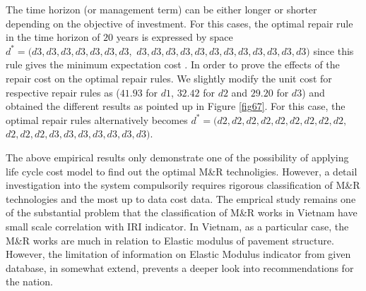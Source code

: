 The time horizon (or management term) can be either longer or shorter depending on the objective of investment. For this cases, the optimal repair rule in the time horizon of $20$ years is expressed by space $d^*=(d3, d3, d3, d3, d3, d3, d3,$ $d3, d3, d3, d3, d3, d3, d3, d3, d3, d3, d3, d3)$ since this rule gives the minimum expectation cost . In order to prove the effects of the repair cost on the optimal repair rules. We slightly modify the unit cost for respective repair rules as ($41.93$ for $d1$, $32.42$ for $d2$ and $29.20$ for $d3$) and obtained the different results as pointed up in Figure \ref{fig67}. For this case, the optimal repair rules alternatively becomes $d^*=(d2, d2, d2, d2, d2, d2, d2, d2, d2,$ $ d2, d2, d2, d3, d3, d3, d3, d3, d3, d3)$.

The above empirical results only demonstrate one of the possibility of applying life cycle cost model to find out the optimal M\&R technoligies. However, a detail investigation into the system compulsorily requires rigorous classification of M\&R technologies and the most up to data cost data. The emprical study remains one of the substantial problem that the classification of M\&R works in Vietnam have small scale correlation with IRI indicator. In Vietnam, as a particular case, the M\&R works are much in relation to Elastic modulus of pavement structure. However, the limitation of information on Elastic Modulus indicator from given database, in somewhat extend, prevents a deeper look into recommendations for the nation.
